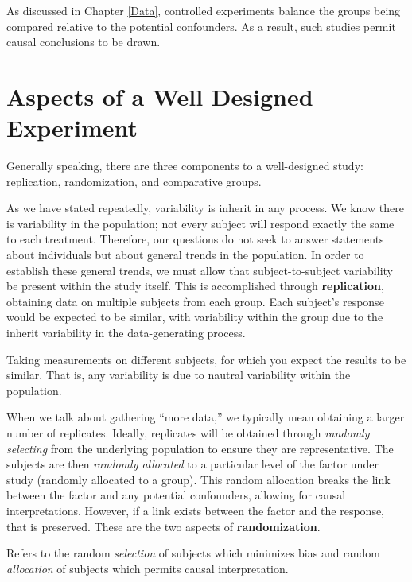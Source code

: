 \documentclass[]{book}
\theoremstyle{definition}
\theoremstyle{definition}
\theoremstyle{remark}
\let\BeginKnitrBlock\begin \let\EndKnitrBlock\end
\begin{document}
As discussed in Chapter \ref{Data}, controlled experiments balance the
groups being compared relative to the potential confounders. As a
result, such studies permit causal conclusions to be drawn.

\section{Aspects of a Well Designed
Experiment}\label{aspects-of-a-well-designed-experiment}

Generally speaking, there are three components to a well-designed study:
replication, randomization, and comparative groups.

As we have stated repeatedly, variability is inherit in any process. We
know there is variability in the population; not every subject will
respond exactly the same to each treatment. Therefore, our questions do
not seek to answer statements about individuals but about general trends
in the population. In order to establish these general trends, we must
allow that subject-to-subject variability be present within the study
itself. This is accomplished through \textbf{replication}, obtaining
data on multiple subjects from each group. Each subject's response would
be expected to be similar, with variability within the group due to the
inherit variability in the data-generating process.

\BeginKnitrBlock{definition}[Replication]
\protect\hypertarget{def:defn-replication}{}{\label{def:defn-replication}
{} }Taking measurements on different subjects,
for which you expect the results to be similar. That is, any variability
is due to nautral variability within the population.
\EndKnitrBlock{definition}

When we talk about gathering ``more data,'' we typically mean obtaining
a larger number of replicates. Ideally, replicates will be obtained
through \emph{randomly selecting} from the underlying population to
ensure they are representative. The subjects are then \emph{randomly
allocated} to a particular level of the factor under study (randomly
allocated to a group). This random allocation breaks the link between
the factor and any potential confounders, allowing for causal
interpretations. However, if a link exists between the factor and the
response, that is preserved. These are the two aspects of
\textbf{randomization}.

\BeginKnitrBlock{definition}[Randomization]
\protect\hypertarget{def:defn-randomization}{}{\label{def:defn-randomization}
{} }Refers to the random \emph{selection} of
subjects which minimizes bias and random \emph{allocation} of subjects
which permits causal interpretation.
\EndKnitrBlock{definition}
\end{document}
